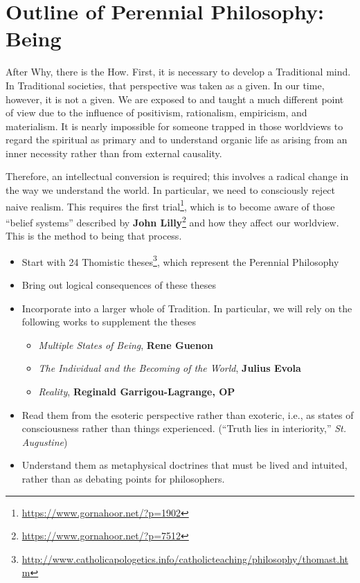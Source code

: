 \section{Outline of Perennial Philosophy: Being}

After Why, there is the How. First, it is necessary to develop a Traditional mind. In Traditional societies, that perspective was taken as a given. In our time, however, it is not a given. We are exposed to and taught a much different point of view due to the influence of positivism, rationalism, empiricism, and materialism. It is nearly impossible for someone trapped in those worldviews to regard the spiritual as primary and to understand organic life as arising from an inner necessity rather than from external causality.

Therefore, an intellectual conversion is required; this involves a radical change in the way we understand the world. In particular, we need to consciously reject naive realism. This requires the first trial\footnote{\url{https://www.gornahoor.net/?p=1902}}, which is to become aware of those “belief systems” described by \textbf{John Lilly}\footnote{\url{https://www.gornahoor.net/?p=7512}} and how they affect our worldview. This is the method to being that process.

\begin{itemize}[nosep]
\item Start with 24 Thomistic theses\footnote{\url{http://www.catholicapologetics.info/catholicteaching/philosophy/thomast.htm}}, which represent the Perennial Philosophy 
\item Bring out logical consequences of these theses 
\item Incorporate into a larger whole of Tradition. In particular, we will rely on the following works to supplement the theses 

\begin{itemize}[nosep]
\item \emph{Multiple States of Being}, \textbf{Rene Guenon} 
\item \emph{The Individual and the Becoming of the World}, \textbf{Julius Evola} 
\item \emph{Reality}, \textbf{Reginald Garrigou-Lagrange, OP} 
\end{itemize}
\item Read them from the esoteric perspective rather than exoteric, i.e., as states of consciousness rather than things experienced. (“Truth lies in interiority,” \textit{St. Augustine}) 
\item Understand them as metaphysical doctrines that must be lived and intuited, rather than as debating points for philosophers. 
\end{itemize}

